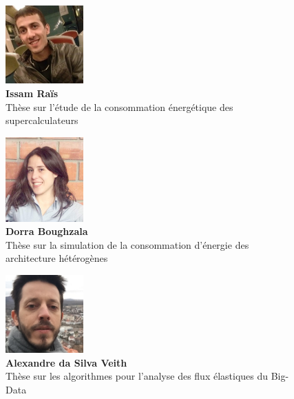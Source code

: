 \begin{figure}[h!]
	\begin{minipage}{0.33\textwidth}
		\centering
		\includegraphics[height=3cm]{partie1/images/issam.jpeg}\\
		\textbf{Issam Raïs}\\
		Thèse sur l'étude de la consommation énergétique des supercalculateurs
	\end{minipage}\hfill
	\begin{minipage}{0.33\textwidth}
		\centering
		\includegraphics[width=3cm]{partie1/images/dorra.png}\\
		\textbf{Dorra Boughzala}\\
		Thèse sur la simulation de la consommation d'énergie des architecture hétérogènes
	\end{minipage}\hfill
	\begin{minipage}{0.33\textwidth}
		\centering
		\includegraphics[width=3cm]{partie1/images/alexandre.jpg}\\
		\textbf{Alexandre da Silva Veith}\\
		Thèse sur les algorithmes pour l'analyse des flux élastiques du Big-Data
	\end{minipage}
\end{figure}
